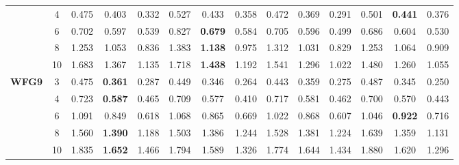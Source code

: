 \documentclass[onecolumn,10pt]{asme2ej}
\begin{document}
\begin{table}[!htb]
\begin{tabular}{|c|c|c|c|c|c|c|c|c|c|c|c|c|c|}
	& 4          & 0.475         & 0.403          & 0.332          & 0.527         & 0.433          & 0.358          & 0.472         & 0.369          & 0.291          & 0.501         & \textbf{0.441} & 0.376          \\ \cline{2-14} 
	& 6          & 0.702         & 0.597          & 0.539          & 0.827         & \textbf{0.679} & 0.584          & 0.705         & 0.596          & 0.499          & 0.686         & 0.604          & 0.530          \\ \cline{2-14} 
	& 8          & 1.253         & 1.053          & 0.836          & 1.383         & \textbf{1.138} & 0.975          & 1.312         & 1.031          & 0.829          & 1.253         & 1.064          & 0.909          \\ \cline{2-14} 
	& 10         & 1.683         & 1.367          & 1.135          & 1.718         & \textbf{1.438} & 1.192          & 1.541         & 1.296          & 1.022          & 1.480         & 1.260          & 1.055          \\ \hline
	\multirow{5}{*}{\textbf{WFG9}} & 3          & 0.475         & \textbf{0.361} & 0.287          & 0.449         & 0.346          & 0.264          & 0.443         & 0.359          & 0.275          & 0.487         & 0.345          & 0.250          \\ \cline{2-14} 
	& 4          & 0.723         & \textbf{0.587} & 0.465          & 0.709         & 0.577          & 0.410          & 0.717         & 0.581          & 0.462          & 0.700         & 0.570          & 0.443          \\ \cline{2-14} 
	& 6          & 1.091         & 0.849          & 0.618          & 1.068         & 0.865          & 0.669          & 1.022         & 0.868          & 0.607          & 1.046         & \textbf{0.922} & 0.716          \\ \cline{2-14} 
	& 8          & 1.560         & \textbf{1.390} & 1.188          & 1.503         & 1.386          & 1.244          & 1.528         & 1.381          & 1.224          & 1.639         & 1.359          & 1.131          \\ \cline{2-14} 
	& 10         & 1.835         & \textbf{1.652} & 1.466          & 1.794         & 1.589          & 1.326          & 1.774         & 1.644          & 1.434          & 1.880         & 1.620          & 1.296          \\ \hline
\end{tabular}
\end{table}
\end{document}

